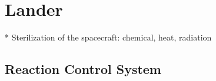 \chapter{Lander}

* Sterilization of the spacecraft: chemical, heat, radiation




\section{Reaction Control System}





